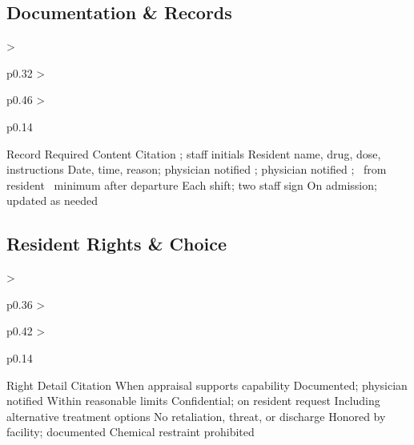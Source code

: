 \subsection{Documentation \& Records}
\begin{cheattablethree}
  {>{\raggedright\arraybackslash}p{0.32\linewidth}
   >{\raggedright\arraybackslash}p{0.46\linewidth}
   >{\raggedright\arraybackslash}p{0.14\linewidth}}
  {Record}
  {Required Content}
  {Citation}
    {\medRecordEntry; staff initials}
    {}
    {\medOrderRequired}
    {}
    {Resident name, drug, dose, instructions}
    {}
    {Date, time, reason; physician notified}
    {}
    {\medErrForm; physician notified}
    {}
    {\medDestructionWitness; \medDestructionLog}
    {}
    {\medCenterStorageAuth\ from resident}
    {}
    {\recRetention\ minimum after departure}
    {}
    {Each shift; two staff sign}
    {}
    {On admission; updated as needed}
    {}
\end{cheattablethree}

\subsection{Resident Rights \& Choice}
\begin{cheattablethree}
  {>{\raggedright\arraybackslash}p{0.36\linewidth}
   >{\raggedright\arraybackslash}p{0.42\linewidth}
   >{\raggedright\arraybackslash}p{0.14\linewidth}}
  {Right}
  {Detail}
  {Citation}
    {When appraisal supports capability}
    {}
    {Documented; physician notified}
    {}
    {Within reasonable limits}
    {}
    {Confidential; on resident request}
    {}
    {Including alternative treatment options}
    {}
    {No retaliation, threat, or discharge}
    {}
    {Honored by facility; documented}
    {}
    {Chemical restraint prohibited}
    {}
\end{cheattablethree}

